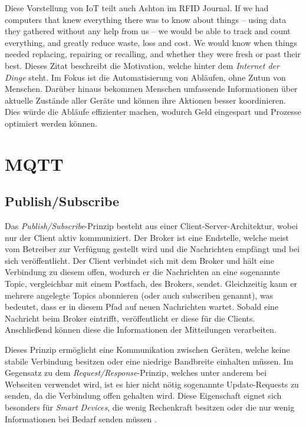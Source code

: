         Diese Vorstellung von \ac{IoT} teilt auch Ashton im RFID Journal.
        \glqq If we had computers that knew everything there was to know about things -- using data they gathered without any help from us -- we would be able to track and count everything, and greatly reduce waste, loss and cost. We would know when things needed replacing, repairing or recalling, and whether they were fresh or past their best.\grqq{} \cite{ashton2009internet}
        Dieses Zitat beschreibt die Motivation, welche hinter dem \emph{Internet der Dinge} steht.
        Im Fokus ist die Automatisierung von Abläufen, ohne Zutun von Menschen. Darüber hinaus bekommen Menschen umfassende Informationen über aktuelle Zustände aller Geräte und können ihre Aktionen besser koordinieren. Dies würde die Abläufe effizienter machen, wodurch Geld eingespart und Prozesse optimiert werden können.

\section{MQTT} \label{MQTT}
    \subsection{Publish/Subscribe}
    Das \emph{Publish/Subscribe}-Prinzip besteht aus einer Client-Server-Architektur, wobei nur der Client aktiv kommuniziert. Der Broker ist eine Endstelle, welche meist vom Betreiber zur Verfügung gestellt wird und die Nachrichten empfängt und bei sich veröffentlicht. Der Client verbindet sich mit dem Broker und hält eine Verbindung zu diesem offen, wodurch er die Nachrichten an eine sogenannte Topic, vergleichbar mit einem Postfach, des Brokers, sendet. Gleichzeitig kann er mehrere angelegte Topics abonnieren (oder auch  \glqq subscriben\grqq{} genannt), was bedeutet, dass er in diesem Pfad auf neuen Nachrichten wartet. Sobald eine Nachricht beim Broker eintrifft, veröffentlicht er diese für die Clients. Anschließend können diese die Informationen der Mitteilungen verarbeiten. \cite{Redbooks2012}

    Dieses Prinzip ermöglicht eine Kommunikation zwischen Geräten, welche keine stabile Verbindung besitzen oder eine niedrige Bandbreite einhalten müssen. Im Gegensatz zu dem \emph{Request/Response}-Prinzip, welches unter anderem bei Webseiten verwendet wird, ist es hier nicht nötig sogenannte \glqq Update-Requests\grqq{} zu senden, da die Verbindung offen gehalten wird.
    Diese Eigenschaft eignet sich besonders für \emph{Smart Devices}, die wenig Rechenkraft besitzen oder die nur wenig Informationen bei Bedarf senden müssen \cite{Hwang2016}.

